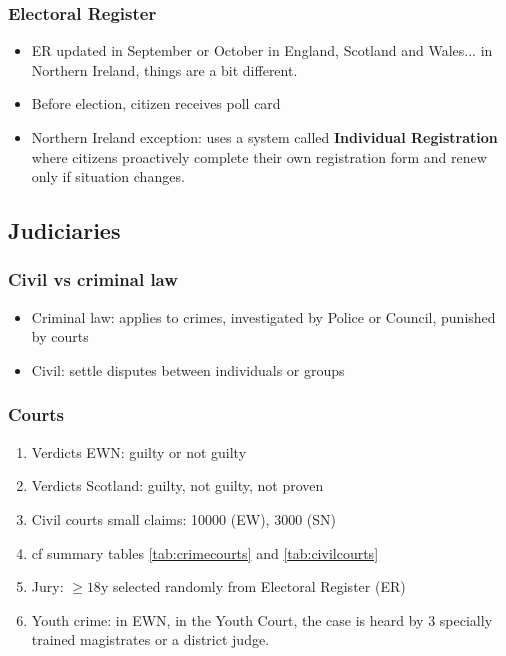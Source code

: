 \documentclass{amsart}
\begin{document}
\subsubsection{Electoral Register}

\begin{itemize}
	\item ER updated in September or October in England, Scotland and Wales... in Northern Ireland, things are a bit different.
	\item Before election, citizen receives poll card
	\item Northern Ireland exception: uses a system called \textbf{Individual Registration} where citizens proactively complete their own registration form and renew only if situation changes.
\end{itemize}

\subsection{Judiciaries}
\subsubsection{Civil vs criminal law}
\begin{itemize}
	\item Criminal law: applies to crimes, investigated by Police or Council, punished by courts
	\item Civil: settle disputes between individuals or groups
\end{itemize}

\subsubsection{Courts}

\begin{enumerate}
\item Verdicts EWN: guilty or not guilty
\item Verdicts Scotland: guilty, not guilty, not proven
\item Civil courts small claims: 10000 (EW), 3000 (SN)
\item cf summary tables \ref{tab:crimecourts} and \ref{tab:civilcourts}
\item Jury: $\geq 18\textrm{y}$ selected randomly from Electoral Register (ER)
\item Youth crime: in EWN, in the Youth Court, the case is heard by 3 specially trained magistrates or a district judge.
\end{enumerate}
\end{document}
